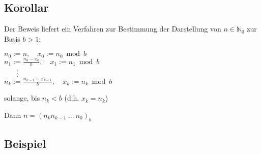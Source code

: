 \documentclass[a4paper, 12pt, twoside] {article}
\begin{document}
\subsection{Korollar}  %

Der Beweis liefert ein Verfahren zur Bestimmung der Darstellung von $n \in \mathbb{N}_0$ zur Basis $b > 1$:

$n_0 := n, \quad x_0 := n_0 \bmod b$ \\
$n_1 := \frac{n_0-x_0}{b}, \quad x_1 := n_1 \bmod b$ \\
$\text{\quad}\ \ \vdots$ \\
$n_k := \frac{n_{k-1}-x_{k-1}}{b}, \quad x_k := n_k \bmod b$

solange, bis $n_k < b$ (d.h. $x_k=n_k$)

Dann $n = (n_k n_{k-1} \ ... \ n_0)_b$

\subsection{Beispiel} %
\end{document}
